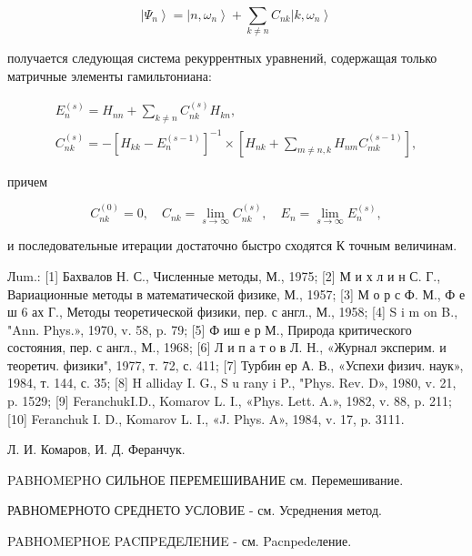 \documentclass[10pt]{article}
\begin{document}
\[

\left|\Psi_{n}\right\rangle=\left|n, \omega_{n}\right\rangle+\sum_{k \neq n} C_{n k}\left|k, \omega_{n}\right\rangle

\]



получается следующая система рекуррентных уравнений, содержащая только матричные элементы гамильтониана:



\[

\begin{gathered}

E_{n}^{(s)}=H_{n n}+\sum_{k \neq n} C_{n k}^{(s)} H_{k n}, \\

C_{n k}^{(s)}=-\left[H_{k k}-E_{n}^{(s-1)}\right]^{-1} \times\left[H_{n k}+\sum_{m \neq n, k} H_{n m} C_{m k}^{(s-1)}\right],

\end{gathered}

\]



причем



\[

C_{n k}^{(0)}=0, \quad C_{n k}=\lim _{s \rightarrow \infty} C_{n k}^{(s)}, \quad E_{n}=\lim _{s \rightarrow \infty} E_{n}^{(s)},

\]



и последовательные итерации достаточно быстро сходятся К точным величинам.



Лum.: [1] Бахвалов Н. С., Численные методы, М., 1975; [2] М и х л и н С. Г., Вариационные методы в математической физике, М., 1957; [3] М о р с Ф. М., Ф е ш 6 ах Г., Методы теоретической физики, пер. с англ., М., 1958; [4] S i m on B., "Ann. Phys.», 1970, v. 58, p. 79; [5] Ф иш е р М., Природа критического состояния, пер. с англ., М., 1968; [6] Л и п а т о в Л. Н., «Журнал эксперим. и теоретич. физики", 1977, т. 72, с. 411; [7] Турбин ер А. В., «Успехи физич. наук», 1984, т. 144, с. 35; [8] H alliday I. G., S u rany i P., "Phys. Rev. D», 1980, v. 21, p. 1529; [9] FeranchukI.D., Komarov L. I., «Phys. Lett. A.», 1982, v. 88, p. 211; [10] Feranchuk I. D., Komarov L. I., «J. Phys. A», 1984, v. 17, p. 3111.



Л. И. Комаров, И. Д. Феранчук.



PABHOMEPHO СИЛЬНОЕ ПЕРЕМЕШИВАНИЕ см. Перемешивание.



РАВНОМЕРНОТО СРЕДНЕТО УСЛОВИЕ - см. Усреднения метод.



PABHOMEPHOE PACПPEДEЛEHИE - см. Pacnpedeление.
\end{document}
